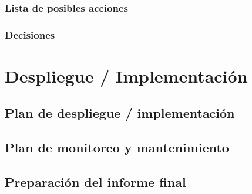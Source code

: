 \documentclass[11pt,a4paper,twoside]{tesis}
\begin{document}
\subsection{Lista de posibles acciones}

\subsection{Decisiones}


\chapter{Despliegue / Implementación}

\section{Plan de despliegue / implementación}

\section{Plan de monitoreo y mantenimiento}

\section{Preparación del informe final}

\end{document}
